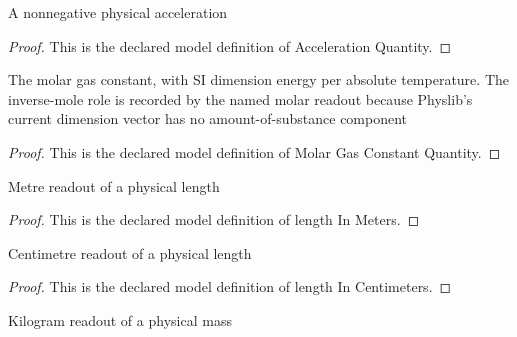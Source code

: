 \begin{definition}
  \label{def:physics:phyx-mini-0374:phyxminiproblems-problemphyxmini0374-accelerationquantity}
  A nonnegative physical acceleration
\end{definition}
\begin{proof}
  This is the declared model definition of Acceleration Quantity.
\end{proof}
\begin{definition}
  \label{def:physics:phyx-mini-0374:phyxminiproblems-problemphyxmini0374-molargasconstantquantity}
  The molar gas constant, with SI dimension energy per absolute temperature. The inverse-mole role is recorded by the named molar readout because Physlib's current dimension vector has no amount-of-substance component
\end{definition}
\begin{proof}
  This is the declared model definition of Molar Gas Constant Quantity.
\end{proof}
\begin{definition}
  \label{def:physics:phyx-mini-0374:phyxminiproblems-problemphyxmini0374-lengthinmeters}
  Metre readout of a physical length
\end{definition}
\begin{proof}
  This is the declared model definition of length In Meters.
\end{proof}
\begin{definition}
  \label{def:physics:phyx-mini-0374:phyxminiproblems-problemphyxmini0374-lengthincentimeters}
  Centimetre readout of a physical length
\end{definition}
\begin{proof}
  This is the declared model definition of length In Centimeters.
\end{proof}
\begin{definition}
  \label{def:physics:phyx-mini-0374:phyxminiproblems-problemphyxmini0374-massinkilograms}
  Kilogram readout of a physical mass
\end{definition}
